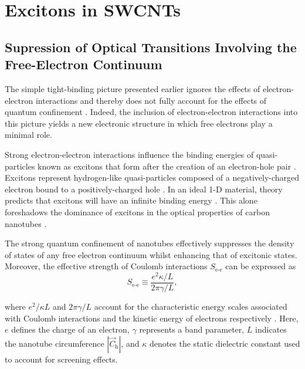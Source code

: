 \section{Excitons in SWCNTs}

\subsection{Supression of Optical Transitions Involving the Free-Electron Continuum}
The simple tight-binding picture presented earlier ignores the effects of electron-electron interactions and thereby does not fully account for the effects of quantum confinement \cite{weismanKonoBook}. Indeed, the inclusion of electron-electron interactions into this picture yields a new electronic structure in which free electrons play a minimal role.

Strong electron-electron interactions influence the binding energies of quasi-particles known as excitons that form after the creation of an electron-hole pair \cite{koch2006semiconductor}. Excitons represent hydrogen-like quasi-particles composed of a negatively-charged electron bound to a positively-charged hole \cite{koch2006semiconductor}. In an ideal 1-D material, theory predicts that excitons will have an infinite binding energy \cite{ando2005theory}. This alone foreshadows the dominance of excitons in the optical properties of carbon nanotubes \cite{ando2005theory}.



The strong quantum confinement of nanotubes effectively suppresses the density of states of any free electron continuum whilst enhancing that of excitonic states. Moreover, the effective strength of Coulomb interactions $S_\text{e-e}$ can be expressed as
\begin{equation}
	S_\text{e-e} \equiv \dfrac{e^2 \kappa / L}{2 \pi \gamma / L},
\end{equation}

where $e^2 /\kappa L$ and $2 \pi \gamma / L$ account for the characteristic energy scales associated with Coulomb interactions and the kinetic energy of electrons respectively \cite{ando2005theory}. Here, $e$ defines the charge of an electron, $\gamma$ represents a band parameter, $L$ indicates the nanotube circumference $|\vec{C}_\text{h}|$, and $\kappa$ denotes the static dielectric constant used to account for screening effects.

